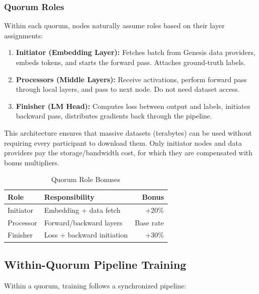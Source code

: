 \documentclass[11pt,a4paper]{article}
\begin{document}
\subsubsection{Quorum Roles}
Within each quorum, nodes naturally assume roles based on their layer assignments:

\begin{enumerate}
    \item \textbf{Initiator (Embedding Layer):} Fetches batch from Genesis data providers, embeds tokens, and starts the forward pass. Attaches ground-truth labels.
    \item \textbf{Processors (Middle Layers):} Receive activations, perform forward pass through local layers, and pass to next node. Do not need dataset access.
    \item \textbf{Finisher (LM Head):} Computes loss between output and labels, initiates backward pass, distributes gradients back through the pipeline.
\end{enumerate}

This architecture ensures that massive datasets (terabytes) can be used without requiring every participant to download them. Only initiator nodes and data providers pay the storage/bandwidth cost, for which they are compensated with bonus multipliers.

\begin{table}[H]
\centering
\caption{Quorum Role Bonuses}
\begin{tabular}{@{}llr@{}}
\toprule
\textbf{Role} & \textbf{Responsibility} & \textbf{Bonus} \\
\midrule
Initiator & Embedding + data fetch & +20\% \\
Processor & Forward/backward layers & Base rate \\
Finisher & Loss + backward initiation & +30\% \\
\bottomrule
\end{tabular}
\end{table}

\subsection{Within-Quorum Pipeline Training}

Within a quorum, training follows a synchronized pipeline:
\end{document}
